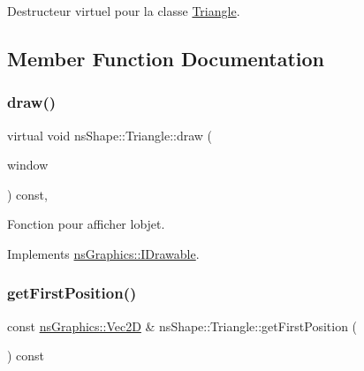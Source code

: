 Destructeur virtuel pour la classe \hyperlink{classns_shape_1_1_triangle}{Triangle}. 



\subsection{Member Function Documentation}
\mbox{\label{classns_shape_1_1_triangle_a4b3867fb0e15995b2a6c261d9b0d968d}} 
\subsubsection{\texorpdfstring{draw()}{draw()}}
{\footnotesize\ttfamily virtual void ns\+Shape\+::\+Triangle\+::draw (\begin{DoxyParamCaption}\item[{\hyperlink{class_min_g_l}{Min\+GL} \&}]{window }\end{DoxyParamCaption}) const\hspace{0.3cm}{\ttfamily [override]}, {\ttfamily [virtual]}}



Fonction pour afficher l\textquotesingle{}objet. 



Implements \hyperlink{classns_graphics_1_1_i_drawable_abed8a61e1d507d31e76f0891f3bf9c51}{ns\+Graphics\+::\+I\+Drawable}.

\mbox{\label{classns_shape_1_1_triangle_ad82e289ac4c9fd8cc569b7a79771fc5f}} 
\subsubsection{\texorpdfstring{get\+First\+Position()}{getFirstPosition()}}
{\footnotesize\ttfamily const \hyperlink{classns_graphics_1_1_vec2_d}{ns\+Graphics\+::\+Vec2D} \& ns\+Shape\+::\+Triangle\+::get\+First\+Position (\begin{DoxyParamCaption}{ }\end{DoxyParamCaption}) const}



